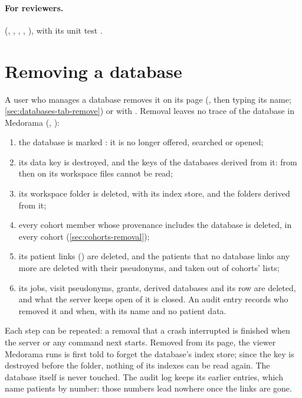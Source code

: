 \paragraph{For reviewers.}  (, ,
, , ), with its unit test
.

\section{Removing a database}
\label{sec:protecting-removal}

A user who manages a database removes it on its page (, then typing its name;
\cref{sec:databases-tab-remove}) or with . Removal leaves no
trace of the database in Medorama (, ):
\begin{enumerate}
\item the database is marked : it is no longer offered, searched or opened;
\item its data key is destroyed, and the keys of the databases derived from it: from then on its
  workspace files cannot be read;
\item its workspace folder is deleted, with its index store, and the folders derived from it;
\item every cohort member whose provenance includes the database is deleted, in every cohort
  (\cref{sec:cohorts-removal});
\item its patient links () are deleted, and the patients that no database
  links any more are deleted with their pseudonyms, and taken out of cohorts' lists;
\item its jobs, visit pseudonyms, grants, derived databases and its row are deleted, and what the
  server keeps open of it is closed. An audit entry records who removed it and when, with its name
  and no patient data.
\end{enumerate}
Each step can be repeated: a removal that a crash interrupted is finished when the server or any
command next starts. Removed from its page, the viewer Medorama runs is first told to forget the
database's index store; since the key is destroyed before the folder, nothing of its indexes can
be read again. The database
itself is never touched. The audit log keeps its earlier entries, which name patients by number:
those numbers lead nowhere once the links are gone.

